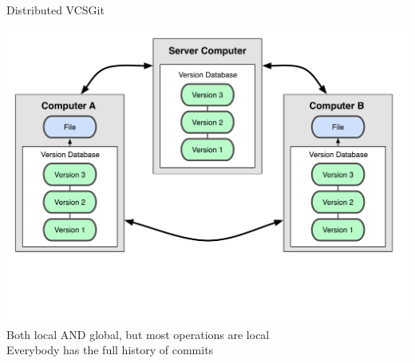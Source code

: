 \documentclass[10pt,xcolor=dvipsnames]{beamer}
\begin{document}
\begin{frame}{Distributed VCS}{Git}

\begin{center}
\centering
\includegraphics [scale=0.3]{VCS_distributed.pdf}
Both local AND global, but most operations are local\\
 Everybody has the full history of commits
\end{center}
\end{frame}
\end{document}
